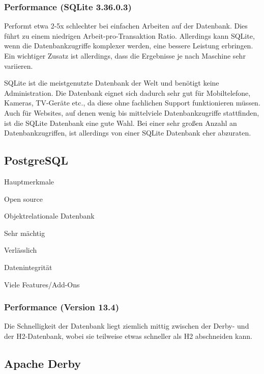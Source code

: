 \subsubsection{Performance (SQLite 3.36.0.3)}
Performt etwa 2-5x schlechter bei einfachen Arbeiten auf der Datenbank. Dies führt zu einem niedrigen Arbeit-pro-Transaktion Ratio. Allerdings kann SQLite, wenn die Datenbankzugriffe komplexer werden, eine bessere Leistung erbringen. Ein wichtiger Zusatz ist allerdings, dass die Ergebnisse je nach Maschine sehr variieren. \cite{databaseComparison}

SQLite ist die meistgenutzte Datenbank der Welt und benötigt keine Administration. Die Datenbank eignet sich dadurch sehr gut für Mobiltelefone, Kameras, TV-Geräte etc., da diese ohne fachlichen Support funktionieren müssen. Auch für Websites, auf denen wenig bis mittelviele Datenbankzugriffe stattfinden, ist die SQLite Datenbank eine gute Wahl. Bei einer sehr großen Anzahl an Datenbankzugriffen, ist allerdings von einer SQLite Datenbank eher abzuraten. \cite{databaseComparison}

\subsection{PostgreSQL}
 
\begin{compactitem}
    \item[Hauptmerkmale]
    \item Open source
    \item Objektrelationale Datenbank        
    \item Sehr mächtig
    \item Verlässlich
    \item Datenintegrität
    \item Viele Features/Add-Ons
\end{compactitem}
\cite{PostgreSQLOfficialSite}

\subsubsection{Performance (Version 13.4)}
Die Schnelligkeit der Datenbank liegt ziemlich mittig zwischen der Derby- und der H2-Datenbank, wobei sie teilweise etwas schneller als H2 abschneiden kann. \cite{databaseComparison}

 
\subsection{Apache Derby}

